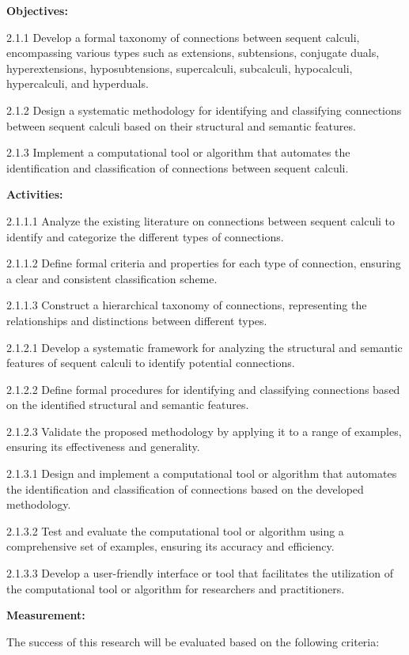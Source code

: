 \textbf{Objectives:}

2.1.1 Develop a formal taxonomy of connections between sequent calculi,
encompassing various types such as extensions, subtensions, conjugate
duals, hyperextensions, hyposubtensions, supercalculi, subcalculi,
hypocalculi, hypercalculi, and hyperduals.

2.1.2 Design a systematic methodology for identifying and classifying
connections between sequent calculi based on their structural and
semantic features.

2.1.3 Implement a computational tool or algorithm that automates the
identification and classification of connections between sequent
calculi.

\textbf{Activities:}

2.1.1.1 Analyze the existing literature on connections between sequent
calculi to identify and categorize the different types of connections.

2.1.1.2 Define formal criteria and properties for each type of
connection, ensuring a clear and consistent classification scheme.

2.1.1.3 Construct a hierarchical taxonomy of connections, representing
the relationships and distinctions between different types.

2.1.2.1 Develop a systematic framework for analyzing the structural and
semantic features of sequent calculi to identify potential connections.

2.1.2.2 Define formal procedures for identifying and classifying
connections based on the identified structural and semantic features.

2.1.2.3 Validate the proposed methodology by applying it to a range of
examples, ensuring its effectiveness and generality.

2.1.3.1 Design and implement a computational tool or algorithm that
automates the identification and classification of connections based on
the developed methodology.

2.1.3.2 Test and evaluate the computational tool or algorithm using a
comprehensive set of examples, ensuring its accuracy and efficiency.

2.1.3.3 Develop a user-friendly interface or tool that facilitates the
utilization of the computational tool or algorithm for researchers and
practitioners.

\textbf{Measurement:}

The success of this research will be evaluated based on the following
criteria:

